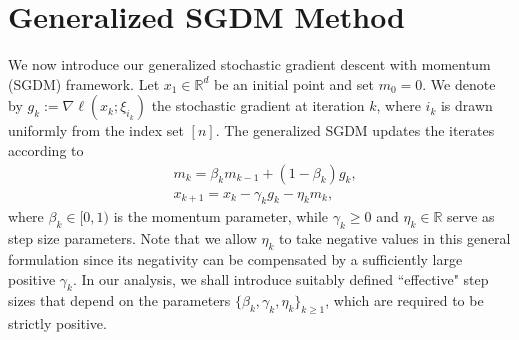 \documentclass[10pt]{article}
\numberwithin{equation}{section}
\theoremstyle{definition}
\newcommand{\rbb}{\mathbb{R}}  %
\begin{document}
\section{Generalized SGDM Method}
\label{sec:algorithm}
We now introduce our generalized stochastic gradient descent with momentum (SGDM) framework. Let $x_1\in\rbb^d$ be an initial point and set $m_0=0$. We denote by $g_k:=\nabla \ell(x_k;\xi_{i_k})$ the stochastic gradient at iteration $k$, where $i_k$ is drawn uniformly from the index set $[n]$. The generalized SGDM updates the iterates according to
\begin{equation}\label{alg:g-sgdm}
\tag{G-SGDM}
    \begin{aligned}
        &m_k=\beta_k m_{k-1}+(1-\beta_k)g_k, \\
        &x_{k+1}=x_k-\gamma_k g_k-\eta_k m_k,
    \end{aligned}
\end{equation}
where $\beta_k\in[0,1)$ is the momentum parameter, while $\gamma_k\ge0$ and $\eta_k\in\rbb$ serve as step size parameters. Note that we allow $\eta_k$ to take negative values in this general formulation since its negativity can be compensated by a sufficiently large positive $\gamma_k$. In our analysis, we shall introduce suitably defined ``effective" step sizes that depend on the parameters $\{\beta_k,\gamma_k,\eta_k\}_{k\ge 1}$, which are required to be strictly positive.
\end{document}
